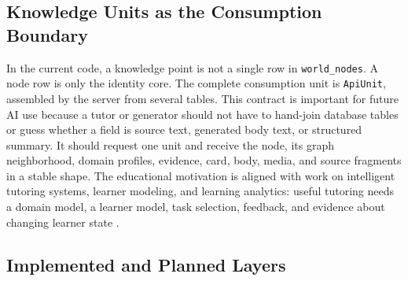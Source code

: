 \documentclass[11pt,letterpaper]{article}
\newcommand{\code}[1]{\nolinkurl{#1}}
\begin{document}
\subsection{Knowledge Units as the Consumption Boundary}

In the current code, a knowledge point is not a single row in \code{world_nodes}. A node row is only the identity core. The complete consumption unit is \code{ApiUnit}, assembled by the server from several tables. This contract is important for future AI use because a tutor or generator should not have to hand-join database tables or guess whether a field is source text, generated body text, or structured summary. It should request one unit and receive the node, its graph neighborhood, domain profiles, evidence, card, body, media, and source fragments in a stable shape. The educational motivation is aligned with work on intelligent tutoring systems, learner modeling, and learning analytics: useful tutoring needs a domain model, a learner model, task selection, feedback, and evidence about changing learner state \cite{vanlehn,corbett-anderson,piech-dkt,bull-kay,koedinger-kli,siemens-learning-analytics}.

\subsection{Implemented and Planned Layers}
\end{document}
